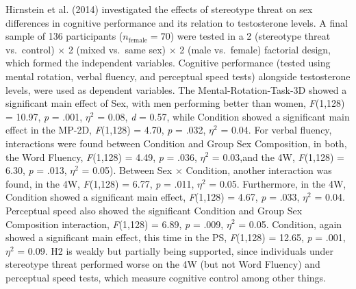 \documentclass[
  stu, a4paper,floatsintext]{apa7}
\begin{document}
Hirnstein et al. (2014) investigated the effects of stereotype threat on sex differences in cognitive performance and its relation to testosterone levels.
A final sample of 136 participants (\(n_{\text{female}} = 70\)) were tested in a 2 (stereotype threat vs.~control) \(\times\) 2 (mixed vs.~same sex) \(\times\) 2 (male vs.~female) factorial design, which formed the independent variables.
Cognitive performance (tested using mental rotation, verbal fluency, and perceptual speed tests) alongside testosterone levels, were used as dependent variables.
The Mental-Rotation-Task-3D showed a significant main effect of Sex, with men performing better than women, \emph{F}(1,128) = 10.97, \emph{p} = .001, \(\eta^{2}\) = 0.08, \emph{d} = 0.57, while Condition showed a significant main effect in the MP-2D, \emph{F}(1,128) = 4.70, \emph{p} = .032, \(\eta^{2}\) = 0.04.
For verbal fluency, interactions were found between Condition and Group Sex Composition, in both, the Word Fluency, \emph{F}(1,128) = 4.49, \emph{p} = .036, \(\eta^{2}\) = 0.03,and the 4W, \emph{F}(1,128) = 6.30, \emph{p} = .013, \(\eta^{2}\) = 0.05).
Between Sex \(\times\) Condition, another interaction was found, in the 4W, \emph{F}(1,128) = 6.77, \emph{p} = .011, \(\eta^{2}\) = 0.05.
Furthermore, in the 4W, Condition showed a significant main effect, \emph{F}(1,128) = 4.67, \emph{p} = .033, \(\eta^{2}\) = 0.04.
Perceptual speed also showed the significant Condition and Group Sex Composition interaction, \emph{F}(1,128) = 6.89, \emph{p} = .009, \(\eta^{2}\) = 0.05.
Condition, again showed a significant main effect, this time in the PS, \emph{F}(1,128) = 12.65, \emph{p} = .001, \(\eta^{2}\) = 0.09.
H2 is weakly but partially being supported, since individuals under stereotype threat performed worse on the 4W (but not Word Fluency) and perceptual speed tests, which measure cognitive control among other things.
\end{document}
